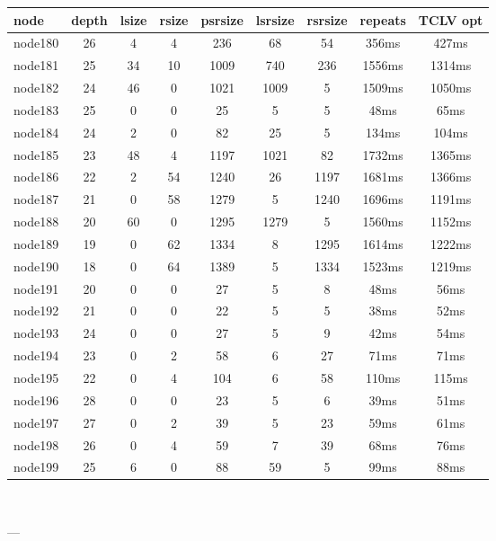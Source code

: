 \begin{tabular}{|l|c|c|c|c|c|c|c|c|}
\hline node & depth & lsize & rsize & psrsize & lsrsize & rsrsize   & repeats & TCLV opt\\
    \hline node180 & 26 & 4 & 4 & 236 & 68 & 54 & 356ms & 427ms\\
    \hline node181 & 25 & 34 & 10 & 1009 & 740 & 236 & 1556ms & 1314ms\\
    \hline node182 & 24 & 46 & 0 & 1021 & 1009 & 5 & 1509ms & 1050ms\\
    \hline node183 & 25 & 0 & 0 & 25 & 5 & 5 & 48ms & 65ms\\
    \hline node184 & 24 & 2 & 0 & 82 & 25 & 5 & 134ms & 104ms\\
    \hline node185 & 23 & 48 & 4 & 1197 & 1021 & 82 & 1732ms & 1365ms\\
    \hline node186 & 22 & 2 & 54 & 1240 & 26 & 1197 & 1681ms & 1366ms\\
    \hline node187 & 21 & 0 & 58 & 1279 & 5 & 1240 & 1696ms & 1191ms\\
    \hline node188 & 20 & 60 & 0 & 1295 & 1279 & 5 & 1560ms & 1152ms\\
    \hline node189 & 19 & 0 & 62 & 1334 & 8 & 1295 & 1614ms & 1222ms\\
    \hline node190 & 18 & 0 & 64 & 1389 & 5 & 1334 & 1523ms & 1219ms\\
    \hline node191 & 20 & 0 & 0 & 27 & 5 & 8 & 48ms & 56ms\\
    \hline node192 & 21 & 0 & 0 & 22 & 5 & 5 & 38ms & 52ms\\
    \hline node193 & 24 & 0 & 0 & 27 & 5 & 9 & 42ms & 54ms\\
    \hline node194 & 23 & 0 & 2 & 58 & 6 & 27 & 71ms & 71ms\\
    \hline node195 & 22 & 0 & 4 & 104 & 6 & 58 & 110ms & 115ms\\
    \hline node196 & 28 & 0 & 0 & 23 & 5 & 6 & 39ms & 51ms\\
    \hline node197 & 27 & 0 & 2 & 39 & 5 & 23 & 59ms & 61ms\\
    \hline node198 & 26 & 0 & 4 & 59 & 7 & 39 & 68ms & 76ms\\
    \hline node199 & 25 & 6 & 0 & 88 & 59 & 5 & 99ms & 88ms\\

\hline
\end{tabular} \

---


